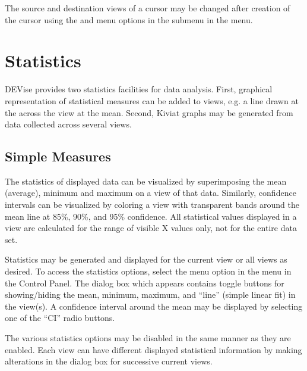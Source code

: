 The source and destination views of a cursor may be changed after creation of
the cursor using the  and  menu options
in the  submenu in the  menu.


\section{Statistics}

DEVise provides two statistics facilities for data analysis. First, graphical
representation of statistical measures can be added to views, e.g. a line drawn
at the across the view at the mean. Second, Kiviat graphs may be generated from
data collected across several views.


\subsection{Simple Measures}

The statistics of displayed data can be visualized by superimposing the mean
(average), minimum and maximum on a view of that data. Similarly, confidence
intervals can be visualized by coloring a view with transparent bands around the
mean line at 85\%, 90\%, and 95\% confidence. All statistical values displayed
in a view are calculated for the range of visible X values only, not for the
entire data set.

Statistics may be generated and displayed for the current view or all views as
desired. To access the statistics options, select the  menu
option in the  menu in the Control Panel. The dialog box which
appears contains toggle buttons for showing/hiding the mean, minimum, maximum,
and ``line'' (simple linear fit) in the view(s). A confidence interval around
the mean may be displayed by selecting one of the ``CI'' radio buttons.

The various statistics options may be disabled in the same manner as they are
enabled. Each view can have different displayed statistical information by
making alterations in the dialog box for successive current views.


